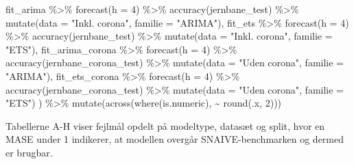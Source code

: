 \documentclass[
  danish,
]{article}
\newenvironment{Shaded}{\begin{snugshade}}{\end{snugshade}}
\newcommand{\AttributeTok}[1]{\textcolor[rgb]{0.40,0.45,0.13}{#1}}
\newcommand{\DecValTok}[1]{\textcolor[rgb]{0.68,0.00,0.00}{#1}}
\newcommand{\FunctionTok}[1]{\textcolor[rgb]{0.28,0.35,0.67}{#1}}
\newcommand{\NormalTok}[1]{\textcolor[rgb]{0.00,0.23,0.31}{#1}}
\newcommand{\SpecialCharTok}[1]{\textcolor[rgb]{0.37,0.37,0.37}{#1}}
\newcommand{\StringTok}[1]{\textcolor[rgb]{0.13,0.47,0.30}{#1}}
\begin{document}
\begin{Shaded}
\begin{Highlighting}[]
\NormalTok{  fit\_arima }\SpecialCharTok{\%\textgreater{}\%} 
    \FunctionTok{forecast}\NormalTok{(}\AttributeTok{h =} \DecValTok{4}\NormalTok{) }\SpecialCharTok{\%\textgreater{}\%} 
    \FunctionTok{accuracy}\NormalTok{(jernbane\_test) }\SpecialCharTok{\%\textgreater{}\%} 
    \FunctionTok{mutate}\NormalTok{(}\AttributeTok{data =} \StringTok{"Inkl. corona"}\NormalTok{, }\AttributeTok{familie =} \StringTok{"ARIMA"}\NormalTok{),}
\NormalTok{  fit\_ets }\SpecialCharTok{\%\textgreater{}\%} 
    \FunctionTok{forecast}\NormalTok{(}\AttributeTok{h =} \DecValTok{4}\NormalTok{) }\SpecialCharTok{\%\textgreater{}\%} 
    \FunctionTok{accuracy}\NormalTok{(jernbane\_test) }\SpecialCharTok{\%\textgreater{}\%} 
    \FunctionTok{mutate}\NormalTok{(}\AttributeTok{data =} \StringTok{"Inkl. corona"}\NormalTok{, }\AttributeTok{familie =} \StringTok{"ETS"}\NormalTok{),}
\NormalTok{  fit\_arima\_corona }\SpecialCharTok{\%\textgreater{}\%} 
    \FunctionTok{forecast}\NormalTok{(}\AttributeTok{h =} \DecValTok{4}\NormalTok{) }\SpecialCharTok{\%\textgreater{}\%} 
    \FunctionTok{accuracy}\NormalTok{(jernbane\_corona\_test) }\SpecialCharTok{\%\textgreater{}\%} 
    \FunctionTok{mutate}\NormalTok{(}\AttributeTok{data =} \StringTok{"Uden corona"}\NormalTok{,  }\AttributeTok{familie =} \StringTok{"ARIMA"}\NormalTok{),}
\NormalTok{  fit\_ets\_corona }\SpecialCharTok{\%\textgreater{}\%} 
    \FunctionTok{forecast}\NormalTok{(}\AttributeTok{h =} \DecValTok{4}\NormalTok{) }\SpecialCharTok{\%\textgreater{}\%} 
    \FunctionTok{accuracy}\NormalTok{(jernbane\_corona\_test) }\SpecialCharTok{\%\textgreater{}\%} 
    \FunctionTok{mutate}\NormalTok{(}\AttributeTok{data =} \StringTok{"Uden corona"}\NormalTok{,  }\AttributeTok{familie =} \StringTok{"ETS"}\NormalTok{)}
\NormalTok{) }\SpecialCharTok{\%\textgreater{}\%}
  \FunctionTok{mutate}\NormalTok{(}\FunctionTok{across}\NormalTok{(}\FunctionTok{where}\NormalTok{(is.numeric), }\SpecialCharTok{\textasciitilde{}} \FunctionTok{round}\NormalTok{(.x, }\DecValTok{2}\NormalTok{)))}
\end{Highlighting}
\end{Shaded}

Tabellerne A-H viser fejlmål opdelt på modeltype, datasæt og split, hvor
en MASE under 1 indikerer, at modellen overgår SNAIVE-benchmarken og
dermed er brugbar.
\end{document}
